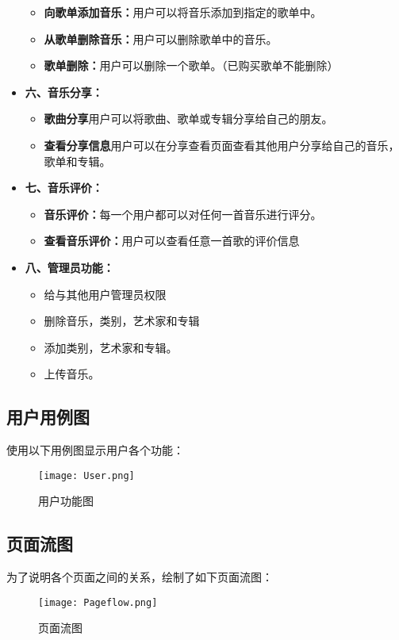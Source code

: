 \begin{itemize}
\begin{itemize}
	\item \textbf{向歌单添加音乐：}用户可以将音乐添加到指定的歌单中。
	\item \textbf{从歌单删除音乐：}用户可以删除歌单中的音乐。
	\item \textbf{歌单删除：}用户可以删除一个歌单。（已购买歌单不能删除）
\end{itemize}
\item \textbf{六、音乐分享：}
\begin{itemize}
	\item \textbf{歌曲分享}用户可以将歌曲、歌单或专辑分享给自己的朋友。
	\item \textbf{查看分享信息}用户可以在分享查看页面查看其他用户分享给自己的音乐，歌单和专辑。
\end{itemize}
\item \textbf{七、音乐评价：}
\begin{itemize}
	\item \textbf{音乐评价：}每一个用户都可以对任何一首音乐进行评分。
	\item \textbf{查看音乐评价：}用户可以查看任意一首歌的评价信息
\end{itemize}
\item \textbf{八、管理员功能：}
\begin{itemize}
	\item \textbf{}给与其他用户管理员权限
	\item \textbf{}删除音乐，类别，艺术家和专辑
	\item \textbf{}添加类别，艺术家和专辑。
	\item \textbf{}上传音乐。
\end{itemize}
\end{itemize}

\subsection{用户用例图}
使用以下用例图显示用户各个功能：
\begin{figure}[ht]
	\centering
	\texttt{[image: User.png]}
	\caption{用户功能图} \label{fig:figure1}
	\end{figure}



		
\subsection{页面流图}
为了说明各个页面之间的关系，绘制了如下页面流图：
\begin{figure}[ht]
	\centering
	\texttt{[image: Pageflow.png]}
	\caption{页面流图} \label{fig:figure3}
	\end{figure}


